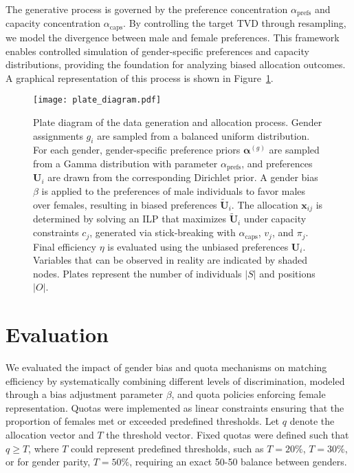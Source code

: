 \documentclass[letterpaper]{article}
\begin{document}
The generative process is governed by the preference concentration \( \alpha_\mathrm{prefs} \) and capacity concentration \( \alpha_\mathrm{caps} \). By controlling the target TVD through resampling, we model the divergence between male and female preferences. This framework enables controlled simulation of gender-specific preferences and capacity distributions, providing the foundation for analyzing biased allocation outcomes. A graphical representation of this process is shown in Figure~\ref{fig:plate_diagram}.



\begin{figure}[ht]

  \centering
  \texttt{[image: plate\_diagram.pdf]}
\caption{Plate diagram of the data generation and allocation process. Gender assignments \( g_i \) are sampled from a balanced uniform distribution. For each gender, gender-specific preference priors \( \mathbf{\alpha}^{(g)} \) are sampled from a Gamma distribution with parameter \( \alpha_\mathrm{prefs} \), and preferences \( \mathbf{U}_i \) are drawn from the corresponding Dirichlet prior. A gender bias \( \beta \) is applied to the preferences of male individuals to favor males over females, resulting in biased preferences \( \tilde{\mathbf{U}}_i \). The allocation \( \mathbf{x}_{ij} \) is determined by solving an ILP that maximizes \( \tilde{\mathbf{U}}_i \) under capacity constraints \( c_j \), generated via stick-breaking with \( \alpha_\mathrm{caps} \), \( v_j \), and \( \pi_j \). Final efficiency \( \eta \) is evaluated using the unbiased preferences \( \mathbf{U}_i \). Variables that can be observed in reality are indicated by shaded nodes. Plates represent the number of individuals \( |S| \) and positions \( |O| \).}

  \label{fig:plate_diagram}
\end{figure}

\section{Evaluation}

We evaluated the impact of gender bias and quota mechanisms on matching efficiency by systematically combining different levels of discrimination, modeled through a bias adjustment parameter \( \beta \), and quota policies enforcing female representation. Quotas were implemented as linear constraints ensuring that the proportion of females met or exceeded predefined thresholds. Let \( q \) denote the allocation vector and \( T \) the threshold vector. Fixed quotas were defined such that \( q \geq T \), where \( T \) could represent predefined thresholds, such as \( T = 20\%\), \( T = 30\%\), or for gender parity, \( T = 50\%\), requiring an exact 50-50 balance between genders.
\end{document}
